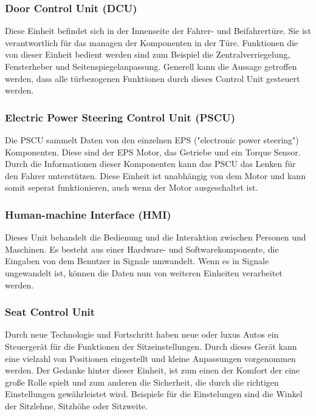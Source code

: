         \subsubsection{Door Control Unit (DCU)}
        Diese Einheit befindet sich in der Innenseite der Fahrer- und Beifahrertüre. Sie ist verantwortlich für das
        managen der Komponenten in der Türe. Funktionen die von dieser Einheit bedient werden sind zum Beispiel die
        Zentralverriegelung, Fensterheber und Seitenspiegelanpassung. Generell kann die Aussage getroffen werden,
        dass alle türbezogenen Funktionen durch dieses Control Unit gesteuert werden.
        ~\cite{doorcontrol.PB1} ~\cite{doorcontrol.PB2}

        \subsubsection{Electric Power Steering Control Unit (PSCU)}
        Die PSCU sammelt Daten von den einzelnen EPS ("electronic power steering") Komponenten. Diese sind der EPS Motor,
        das Getriebe und ein Torque Sensor. Durch die Informationen dieser Komponenten kann das PSCU das Lenken für den
        Fahrer unterstützen. Diese Einheit ist unabhängig von dem Motor und kann somit seperat funktionieren, auch wenn
        der Motor ausgeschaltet ist.
        ~\cite{PSCU.PB1}

        \subsubsection{Human-machine Interface (HMI)}
        Dieses Unit behandelt die Bedienung und die Interaktion zwischen Personen und Maschinen. Es besteht aus einer
        Hardware- und Softwarekomponente, die Eingaben von dem Benutzer in Signale umwandelt. Wenn es in Signale
        ungewandelt ist, können die Daten nun von weiteren Einheiten verarbeitet werden.
        ~\cite{HMI.PB1} ~\cite{HMI.PB2}

        \subsubsection{Seat Control Unit}
        Durch neue Technologie und Fortschritt haben neue oder luxus Autos ein Steuergerät für die Funktionen der Sitzeinstellungen.
        Durch dieses Gerät kann eine vielzahl von Positionen eingestellt und kleine Anpassungen vorgenommen werden.
        Der Gedanke hinter dieser Einheit, ist zum einen der Komfort der eine große Rolle spielt und zum anderen die Sicherheit,
        die durch die richtigen Einstellungen gewährleistet wird. Beispiele für die Einstelungen sind die Winkel der Sitzlehne,
        Sitzhöhe oder Sitzweite.
        ~\cite{seatcontrol.PB1} ~\cite{seatcontrol.PB2} 

